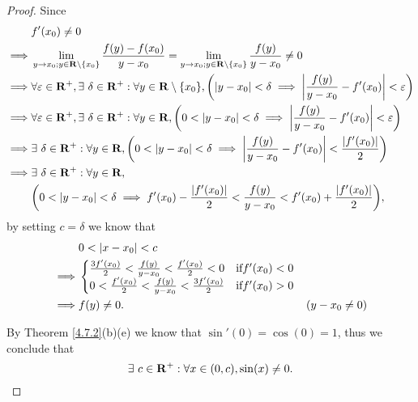 \begin{proof}
    Since
    \begin{align*}
                 & f'(x_0) \neq 0                                                                                                                                                                              \\
        \implies & \lim_{y \to x_0 ; y \in \R \setminus \{x_0\}} \frac{f(y) - f(x_0)}{y - x_0} = \lim_{y \to x_0 ; y \in \R \setminus \{x_0\}} \frac{f(y)}{y - x_0} \neq 0                                     \\
        \implies & \forall \varepsilon \in \R^+, \exists\ \delta \in \R^+ : \forall y \in \R \setminus \{x_0\}, \bigg(\abs{y - x_0} < \delta \implies \abs{\frac{f(y)}{y - x_0} - f'(x_0)} < \varepsilon\bigg) \\
        \implies & \forall \varepsilon \in \R^+, \exists\ \delta \in \R^+ : \forall y \in \R, \bigg(0 < \abs{y - x_0} < \delta \implies \abs{\frac{f(y)}{y - x_0} - f'(x_0)} < \varepsilon\bigg)               \\
        \implies & \exists\ \delta \in \R^+ : \forall y \in \R, \bigg(0 < \abs{y - x_0} < \delta \implies \abs{\frac{f(y)}{y - x_0} - f'(x_0)} < \frac{\abs{f'(x_0)}}{2}\bigg)                                 \\
        \implies & \exists\ \delta \in \R^+ : \forall y \in \R,                                                                                                                                                \\
                 & \bigg(0 < \abs{y - x_0} < \delta \implies f'(x_0) - \frac{\abs{f'(x_0)}}{2} < \frac{f(y)}{y - x_0} < f'(x_0) + \frac{\abs{f'(x_0)}}{2}\bigg),
    \end{align*}
    by setting \(c = \delta\) we know that
    \begin{align*}
                 & 0 < \left\lvert x - x_0\right\rvert < c                                                                                            \\
        \implies & \begin{cases}
                       \frac{3 f'(x_0)}{2} < \frac{f(y)}{y - x_0} < \frac{f'(x_0)}{2} < 0 & \text{if} f'(x_0) < 0 \\
                       0 < \frac{f'(x_0)}{2} < \frac{f(y)}{y - x_0} < \frac{3 f'(x_0)}{2} & \text{if} f'(x_0) > 0
                   \end{cases}                       \\
        \implies & f(y) \neq 0.                                                                                  & (y - x_0 \neq 0)
    \end{align*}

    By Theorem \ref{4.7.2}(b)(e) we know that \(\sin'(0) = \cos(0) = 1\), thus we conclude that
    \[
        \exists\ c \in \mathbf{R}^+ : \forall x \in (0, c), \sin(x) \neq 0.
    \]
\end{proof}

